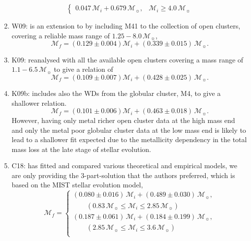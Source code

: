 \documentclass[fleqn,usenatbib]{rasti}
\newcommand{\msun}{\mathcal{M}_{\sun}}
\begin{document}
\begin{enumerate}
\begin{equation}
\begin{cases}
                  0.047\,\mathcal{M}_i + 0.679\,\msun, &\mathcal{M}_i \geq 4.0\,\msun
              \end{cases}
    \end{equation}
    \item W09: \citet{2009ApJ...693..355W} is an extension to \citet{2009ApJ...692.1013S} by including M41 to the collection of open clusters, covering a reliable mass range of $1.25-8.0\,\msun$,
    \begin{equation}
        \mathcal{M}_f = (0.129 \pm 0.004) \mathcal{M}_i + (0.339 \pm 0.015)\,\msun.
    \end{equation}
    \item K09: \citet{2009ApJ...705..408K} reanalysed with all the available open clusters covering a mass range of $1.1-6.5\,\msun$ to give a relation of
    \begin{equation}
        \mathcal{M}_f = (0.109 \pm 0.007) \mathcal{M}_i + (0.428 \pm 0.025)\,\msun.
    \end{equation}
    \item K09b: \citet[][extended]{2009ApJ...705..408K} includes also the WDs from the globular cluster, M4, to give a shallower relation.
    \begin{equation}
        \mathcal{M}_f = (0.101 \pm 0.006) \mathcal{M}_i + (0.463 \pm 0.018)\,\msun.
    \end{equation}
    However, having only metal richer open cluster data at the high mass end and only the metal poor globular cluster data at the low mass end is likely to lead to a shallower fit expected due to the metallicity dependency in the total mass loss at the late stage of stellar evolution.
    \item C18: \citet{2018ApJ...866...21C} has fitted and compared various theoretical and empirical models, we are only providing the 3-part-solution that the authors preferred, which is based on the MIST stellar evolution model,
    \begin{equation}
        \mathcal{M}_f = \begin{cases}
                  (0.080 \pm 0.016)\,\mathcal{M}_i + (0.489 \pm 0.030)\,\msun,\\
                  \qquad(0.83\,\msun \leq \mathcal{M}_i \leq 2.85\,\msun)\\
                  (0.187 \pm 0.061)\,\mathcal{M}_i + (0.184 \pm 0.199)\,\msun,\\
                  \qquad(2.85\,\msun \leq \mathcal{M}_i \leq 3.6\,\msun)\\

\end{cases}
\end{equation}
\end{enumerate}
\end{document}

